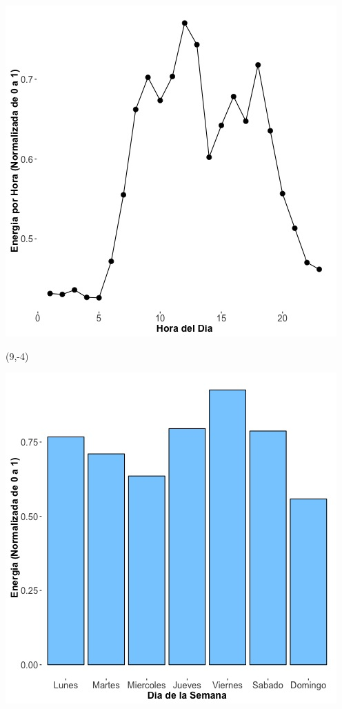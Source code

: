 \documentclass{article}\usepackage[]{graphicx}\usepackage[]{color}
\newenvironment{knitrout}{}{} %
\begin{document}
\begin{knitrout}
\color{fgcolor}
\includegraphics[scale=0.65]{figure/A29_plot_norm_median} 
\end{knitrout}


 \begin{textblock}{1}(9,-4)
\begin{minipage}{20em}
\begingroup

\endgroup
\end{minipage}
\end{textblock}


\begin{knitrout}
\color{fgcolor}
\includegraphics[scale=0.65]{figure/A29_day_of_week_plot} 
\end{knitrout}
\end{document}
